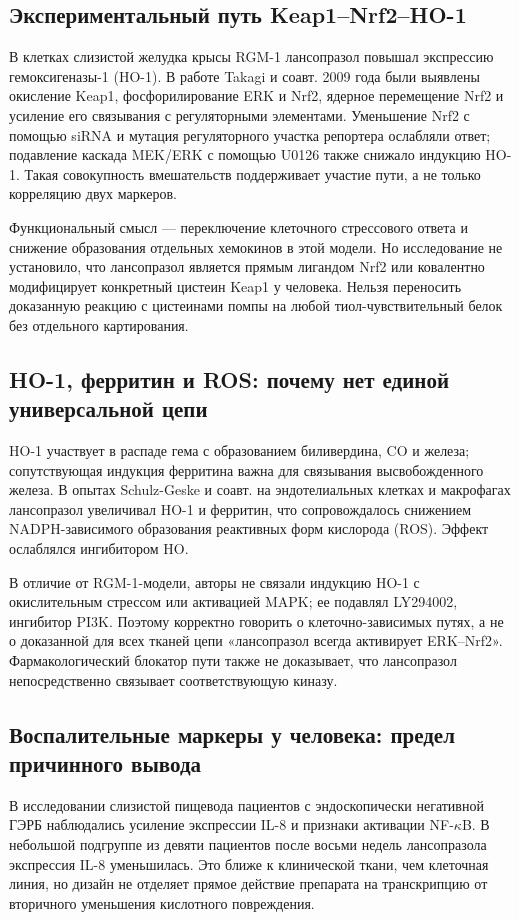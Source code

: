 \documentclass[11pt,a4paper,notitlepage]{report}
\newcommand{\src}[1]{\unskip\space\cite{#1}}
\begin{document}
\subsection{Экспериментальный путь Keap1--Nrf2--HO-1}
\label{sec:nrf2}
В клетках слизистой желудка крысы RGM-1 лансопразол повышал экспрессию гемоксигеназы-1 (HO-1). В работе Takagi и соавт. 2009 года были выявлены окисление Keap1, фосфорилирование ERK и Nrf2, ядерное перемещение Nrf2 и усиление его связывания с регуляторными элементами. Уменьшение Nrf2 с помощью siRNA и мутация регуляторного участка репортера ослабляли ответ; подавление каскада MEK/ERK с помощью U0126 также снижало индукцию HO-1. Такая совокупность вмешательств поддерживает участие пути, а не только корреляцию двух маркеров.\src{molnrf2}

Функциональный смысл --- переключение клеточного стрессового ответа и снижение образования отдельных хемокинов в этой модели. Но исследование не установило, что лансопразол является прямым лигандом Nrf2 или ковалентно модифицирует конкретный цистеин Keap1 у человека. Нельзя переносить доказанную реакцию с цистеинами помпы на любой тиол-чувствительный белок без отдельного картирования.\src{molnrf2}

\subsection{HO-1, ферритин и ROS: почему нет единой универсальной цепи}
\label{sec:ho1}
HO-1 участвует в распаде гема с образованием биливердина, CO и железа; сопутствующая индукция ферритина важна для связывания высвобожденного железа. В опытах Schulz-Geske и соавт. на эндотелиальных клетках и макрофагах лансопразол увеличивал HO-1 и ферритин, что сопровождалось снижением NADPH-зависимого образования реактивных форм кислорода (ROS). Эффект ослаблялся ингибитором HO.\src{molho1}

В отличие от RGM-1-модели, авторы не связали индукцию HO-1 с окислительным стрессом или активацией MAPK; ее подавлял LY294002, ингибитор PI3K. Поэтому корректно говорить о клеточно-зависимых путях, а не о доказанной для всех тканей цепи «лансопразол всегда активирует ERK--Nrf2». Фармакологический блокатор пути также не доказывает, что лансопразол непосредственно связывает соответствующую киназу.\src{molho1,molnrf2}

\subsection{Воспалительные маркеры у человека: предел причинного вывода}
\label{sec:inflammatory-markers}
В исследовании слизистой пищевода пациентов с эндоскопически негативной ГЭРБ наблюдались усиление экспрессии IL-8 и признаки активации NF-$\kappa$B. В небольшой подгруппе из девяти пациентов после восьми недель лансопразола экспрессия IL-8 уменьшилась. Это ближе к клинической ткани, чем клеточная линия, но дизайн не отделяет прямое действие препарата на транскрипцию от вторичного уменьшения кислотного повреждения.\src{molil8}
\end{document}
